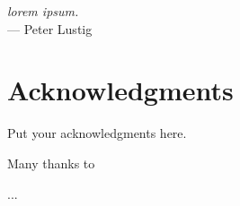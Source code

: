 
\begin{flushright}{\slshape
    lorem ipsum.
    }\\ \medskip
    --- Peter Lustig
\end{flushright}



\bigskip

\begingroup
\let\clearpage\relax
\let\cleardoublepage\relax
\let\cleardoublepage\relax
\chapter*{Acknowledgments}
Put your acknowledgments here.

Many thanks to

...
\bigskip

\endgroup
